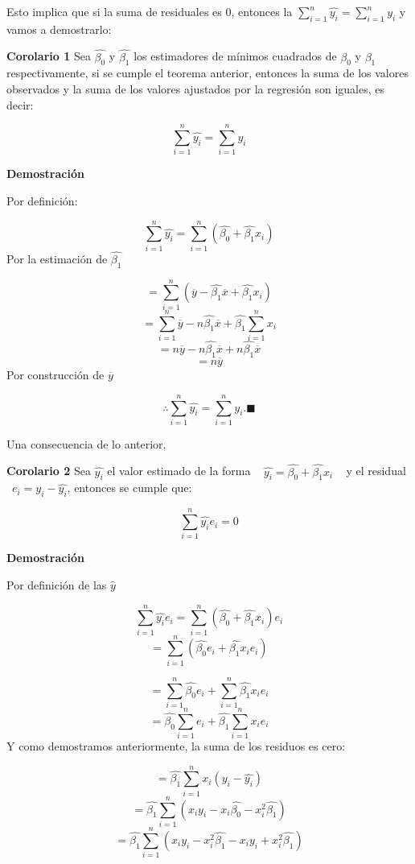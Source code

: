 \documentclass[
  a4paper,
  oneside,
  openany]{book}
\begin{document}
Esto implica que si la suma de residuales es 0, entonces la \(\sum_{i=1}^{n}\hat{y_{i}}=\sum_{i=1}^{n}y_{i}\) y vamos a demostrarlo:

\textbf{Corolario 1} Sea \(\hat{\beta_{0}}\) y \(\hat{\beta_{1}}\) los estimadores de mínimos cuadrados de \(\beta_{0}\) y \(\beta_{1}\) respectivamente, si se cumple el teorema anterior, entonces la suma de los valores observados y la suma de los valores ajustados por la regresión son iguales, es decir:

\[\sum_{i=1}^{n}\hat{y_{i}}=\sum_{i=1}^{n}y_{i}\]

\textbf{Demostración}

Por definición:

\[\sum_{i=1}^{n}\hat{y_{i}}=\sum_{i=1}^{n}\left(\hat{\beta_{0}}+\hat{\beta_{1}}x_{i}\right)\]
Por la estimación de \(\hat{\beta_{1}}\)

\[=\sum_{i=1}^{n}\left(\overline{y}-\hat{\beta_{1}}\overline{x}+\hat{\beta_{1}}x_{i}\right)\]
\[=\sum_{i=1}^{n}\overline{y}-n\hat{\beta_{1}}\overline{x}+\hat{\beta_{1}}\sum_{i=1}^{n}x_{i}\]
\[=n\overline{y}-n\hat{\beta_{1}}\overline{x}+n\hat{\beta_{1}}\overline{x}\]
\[=n\overline{y}\]
Por construcción de \(\overline{y}\)

\[\therefore \sum_{i=1}^{n}\hat{y_{i}}=\sum_{i=1}^{n}y_{i}. \blacksquare\]

Una consecuencia de lo anterior,

\textbf{Corolario 2} Sea \(\hat{y_{i}}\) el valor estimado de la forma ~ \(\hat{y_{i}}=\hat{\beta_{0}}+\hat{\beta_{1}}x_{i}\) ~ y el residual ~\(e_{i}=y_{i}-\hat{y_{i}}\), entonces se cumple que:

\[\sum_{i=1}^{n}\hat{y_{i}}e_{i}=0\]

\textbf{Demostración}

Por definición de las \(\hat{y}\)

\[\sum_{i=1}^{n}\hat{y_{i}}e_{i}=\sum_{i=1}^{n}(\hat{\beta_{0}}+\hat{\beta_{1}}x_{i})e_{i}\]
\[=\sum_{i=1}^{n}\left(\hat{\beta_{0}}e_{i}+\hat{\beta_{1}}x_{i}e_{i}\right)\]

\[=\sum_{i=1}^{n}\hat{\beta_{0}}e_{i}+\sum_{i=1}^{n}\hat{\beta_{1}}x_{i}e_{i}\]
\[=\hat{\beta_{0}}\sum_{i=1}^{n}e_{i}+\hat{\beta_{1}}\sum_{i=1}^{n}x_{i}e_{i}\]
Y como demostramos anteriormente, la suma de los residuos es cero:

\[=\hat{\beta_{1}}\sum_{i=1}^{n}x_{i}(y_{i}-\hat{y_{i}})\]
\[=\hat{\beta_{1}}\sum_{i=1}^{n}\left(x_{i}y_{i}-x_{i}\hat{\beta_{0}}-x_{i}^{2}\hat{\beta_{1}}\right)\]
\[=\hat{\beta_{1}}\sum_{i=1}^{n}\left(x_{i}y_{i}-x_{i}^2\hat{\beta_{1}}-x_{i}y_{i}+x_{i}^{2}\hat{\beta_{1}}\right)\]
\end{document}
